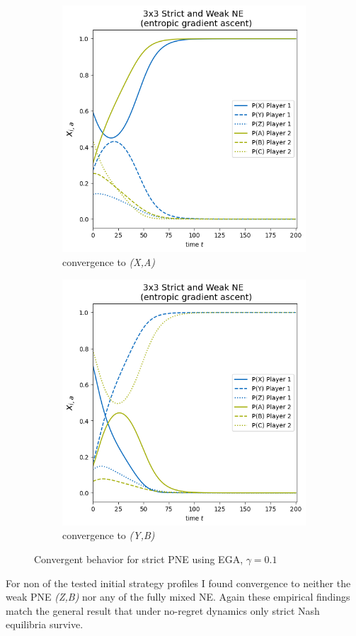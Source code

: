 \begin{figure}[H]
\captionsetup{justification=centering}
\centering
\begin{subfigure}{.5\textwidth}
    \centering
    \includegraphics[width=\textwidth]{logos/Weak3x3a.png}
    \caption{convergence to \textit{(X,A)}}
    \label{fig:Weak3x3a}
\end{subfigure}%
\begin{subfigure}{.5\textwidth}
    \centering
    \includegraphics[width=\textwidth]{logos/Weak3x3b.png}
    \caption{convergence to \textit{(Y,B)}}
    \label{fig:Weak3x3b}
\end{subfigure}
\caption{Convergent behavior for strict PNE using EGA, $\gamma = 0.1$}
\label{fig:Weak3x3}
\end{figure}

For non of the tested initial strategy profiles I found convergence to neither the weak PNE \textit{(Z,B)} nor any of the fully mixed NE. Again these empirical findings match the general result that under no-regret dynamics only strict Nash equilibria survive.  
